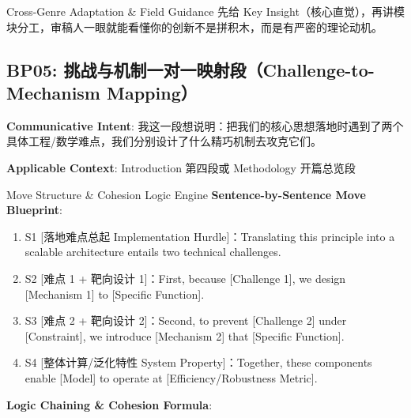 \endgroup
\vspace{4pt}
\begin{TipBox}{Cross-Genre Adaptation \& Field Guidance}
先给 Key Insight（核心直觉），再讲模块分工，审稿人一眼就能看懂你的创新不是拼积木，而是有严密的理论动机。
\end{TipBox}
\vspace{8pt}
\subsection{BP05: 挑战与机制一对一映射段（Challenge-to-Mechanism Mapping）}\label{sec:bp:BP05}
\noindent\textbf{\color{AcadNavy}Communicative Intent}: 我这一段想说明：把我们的核心思想落地时遇到了两个具体工程/数学难点，我们分别设计了什么精巧机制去攻克它们。\par\vspace{2pt}
\noindent\textbf{\color{AcadSlate}Applicable Context}: Introduction 第四段或 Methodology 开篇总览段\par\vspace{4pt}
\begin{ConceptBox}{Move Structure \& Cohesion Logic Engine}
\textbf{Sentence-by-Sentence Move Blueprint}:
\begin{enumerate}[label=\textbf{\color{AcadNavy}S\arabic*.}, leftmargin=2em, itemsep=2pt]
  \item S1 [落地难点总起 Implementation Hurdle]：Translating this principle into a scalable architecture entails two technical challenges.
  \item S2 [难点 1 + 靶向设计 1]：First, because [Challenge 1], we design [Mechanism 1] to [Specific Function].
  \item S3 [难点 2 + 靶向设计 2]：Second, to prevent [Challenge 2] under [Constraint], we introduce [Mechanism 2] that [Specific Function].
  \item S4 [整体计算/泛化特性 System Property]：Together, these components enable [Model] to operate at [Efficiency/Robustness Metric].
\end{enumerate}\par\vspace{4pt}
\textbf{Logic Chaining \& Cohesion Formula}:\par{}
\end{ConceptBox}
